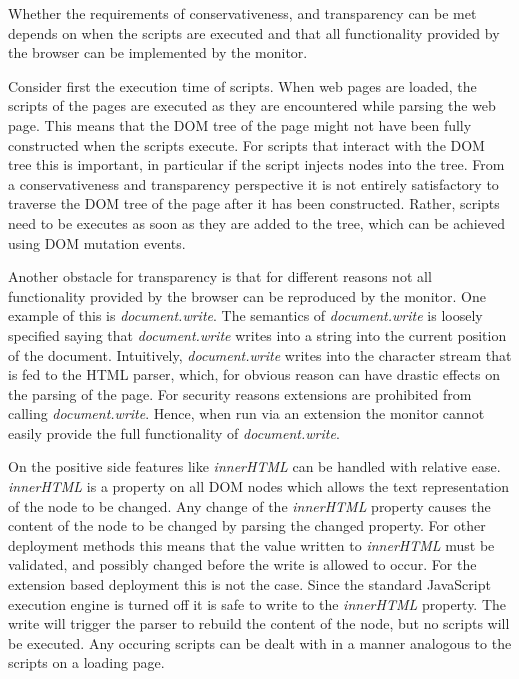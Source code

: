 \documentclass{llncs}
\begin{document}
Whether the requirements of conservativeness, and transparency can be met
depends on when the scripts are executed and that all functionality provided by
the browser can be implemented by the monitor.

Consider first the execution time of scripts. When web pages are loaded, the
scripts of the pages are executed as they are encountered while parsing the web
page. This means that the DOM tree of the page might not have been fully
constructed when the scripts execute.  For scripts that interact with the DOM
tree this is important, in particular if the script injects nodes into the
tree. From a conservativeness and transparency perspective it is not entirely
satisfactory to traverse the DOM tree of the page after it has been
constructed.  Rather, scripts need to be executes as soon as they are added to
the tree, which can be achieved using DOM mutation events.

Another obstacle for transparency is that for different reasons not all
functionality provided by the browser can be reproduced by the monitor. One
example of this is \emph{document.write}. The semantics of
\emph{document.write} is loosely specified saying that \emph{document.write}
writes into a string into the current position of the document.  Intuitively,
\emph{document.write} writes into the character stream that is fed to the HTML
parser, which, for obvious reason can have drastic effects on the parsing of
the page. For security reasons extensions are prohibited from calling
\emph{document.write}. Hence, when run via an extension the monitor cannot
easily provide the full functionality of \emph{document.write}. 

On the positive side features like \emph{innerHTML} can be handled with
relative ease. \emph{innerHTML} is a property on all DOM nodes which allows the
text representation of the node to be changed. Any change of the
\emph{innerHTML} property causes the content of the node to be changed by
parsing the changed property. For other deployment methods this means that the
value written to \emph{innerHTML} must be validated, and possibly changed
before the write is allowed to occur.  For the extension based deployment this
is not the case.  Since the standard JavaScript execution engine is turned off
it is safe to write to the \emph{innerHTML} property. The write will trigger
the parser to rebuild the content of the node, but no scripts will be executed.
Any occuring scripts can be dealt with in a manner analogous to the scripts on
a loading page.
\end{document}
